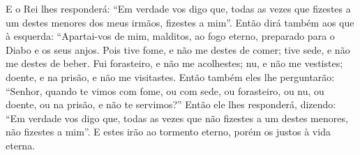 {  E o Rei lhes responderá: “Em verdade vos digo que, todas as vezes que fizestes a um destes menores dos meus irmãos, fizestes a mim”.
  Então dirá também aos que
{} à esquerda: “Apartai-vos de mim, malditos, ao fogo eterno, preparado para o Diabo e os seus anjos.
  Pois tive fome, e não me destes de comer; tive sede, e não me destes de beber.
  Fui forasteiro, e não me acolhestes;
{} nu, e não me vestistes;
{} doente, e na prisão, e não me visitastes.
  Então também eles lhe perguntarão: “Senhor, quando te vimos com fome, ou com sede, ou forasteiro, ou nu, ou doente, ou na prisão, e não te servimos?”
  Então ele lhes responderá, dizendo: “Em verdade vos digo que, todas as vezes que não fizestes a um destes menores, não fizestes a mim”.
  E estes irão ao tormento eterno, porém os justos à vida eterna.
\par }

